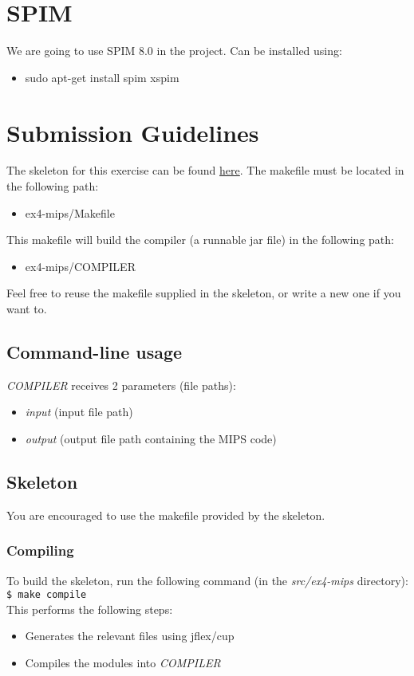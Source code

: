 \documentclass{article}
\begin{document}
\section{SPIM}
We are going to use SPIM 8.0 in the project.
Can be installed using:
\begin{itemize}
\item sudo apt-get install spim xspim
\end{itemize}

\section{Submission Guidelines}
The skeleton for this exercise can be found \href{https://github.com/davidtr1037/compilation-tau/tree/master/src/ex4}{here}.
The makefile must be located in the following path:
\begin{itemize}
    \item ex4-mips/Makefile
\end{itemize}
This makefile will build the compiler (a runnable jar file) in the following path:
\begin{itemize}
    \item ex4-mips/COMPILER
\end{itemize}
Feel free to reuse the makefile supplied in the skeleton,
or write a new one if you want to.

\subsection{Command-line usage}
\textit{COMPILER} receives 2 parameters (file paths):
\begin{itemize}
    \item \textit{input} (input file path)
    \item \textit{output} (output file path containing the MIPS code)
\end{itemize}

\subsection{Skeleton}
You are encouraged to use the makefile provided by the skeleton.
\subsubsection{Compiling}
To build the skeleton, run the following command (in the \textit{src/ex4-mips} directory): \\
\texttt{\$ make compile} \\
This performs the following steps:
\begin{itemize}
    \item Generates the relevant files using jflex/cup
    \item Compiles the modules into \textit{COMPILER}
\end{itemize}
\end{document}
